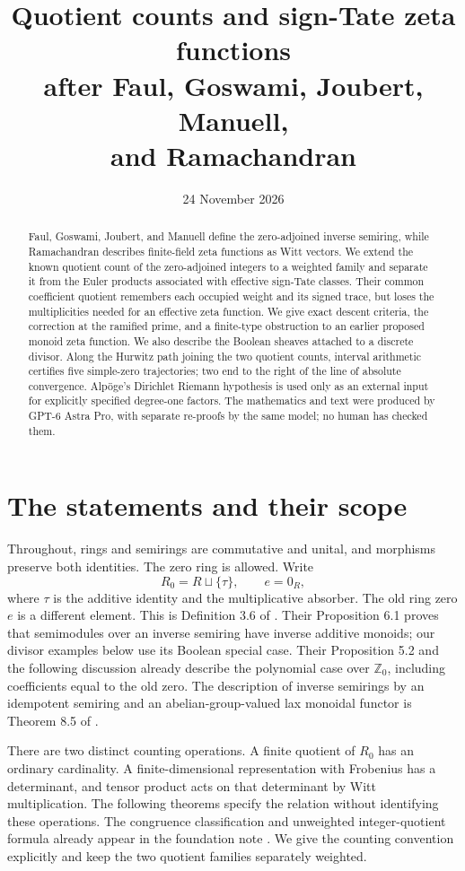 \documentclass[11pt]{article}
\title{Quotient counts and sign-Tate zeta functions\\after Faul, Goswami, Joubert, Manuell,\\and Ramachandran}
\author{}
\date{24 November 2026}
\newcommand{\Z}{\mathbb Z}\newcommand{\N}{\mathbb N}\newcommand{\Q}{\mathbb Q}
\theoremstyle{definition}\newtheorem{definition}[theorem]{Definition}
\begin{document}
\maketitle
\begin{abstract}
Faul, Goswami, Joubert, and Manuell define the zero-adjoined inverse semiring, while Ramachandran describes finite-field zeta functions as Witt vectors. We extend the known quotient count of the zero-adjoined integers to a weighted family and separate it from the Euler products associated with effective sign-Tate classes. Their common coefficient quotient remembers each occupied weight and its signed trace, but loses the multiplicities needed for an effective zeta function. We give exact descent criteria, the correction at the ramified prime, and a finite-type obstruction to an earlier proposed monoid zeta function. We also describe the Boolean sheaves attached to a discrete divisor. Along the Hurwitz path joining the two quotient counts, interval arithmetic certifies five simple-zero trajectories; two end to the right of the line of absolute convergence. Alp\"oge's Dirichlet Riemann hypothesis is used only as an external input for explicitly specified degree-one factors. The mathematics and text were produced by GPT-6 Astra Pro, with separate re-proofs by the same model; no human has checked them.
\end{abstract}

\section{The statements and their scope}
Throughout, rings and semirings are commutative and unital, and morphisms preserve both identities. The zero ring is allowed. Write
\[
 R_0=R\sqcup\{\tau\},\qquad e=0_R,
\]
where $\tau$ is the additive identity and the multiplicative absorber. The old ring zero $e$ is a different element. This is Definition 3.6 of \citet{FGJM}. Their Proposition 6.1 proves that semimodules over an inverse semiring have inverse additive monoids; our divisor examples below use its Boolean special case. Their Proposition 5.2 and the following discussion already describe the polynomial case over $\Z_0$, including coefficients equal to the old zero. The description of inverse semirings by an idempotent semiring and an abelian-group-valued lax monoidal functor is Theorem 8.5 of \citet{CFMM}.

There are two distinct counting operations. A finite quotient of $R_0$ has an ordinary cardinality. A finite-dimensional representation with Frobenius has a determinant, and tensor product acts on that determinant by Witt multiplication. The following theorems specify the relation without identifying these operations. The congruence classification and unweighted integer-quotient formula already appear in the foundation note \citep[Theorem~1(c), p.~2, and Remark~3.4, p.~5]{FoundationPublic}. We give the counting convention explicitly and keep the two quotient families separately weighted.
\end{document}
